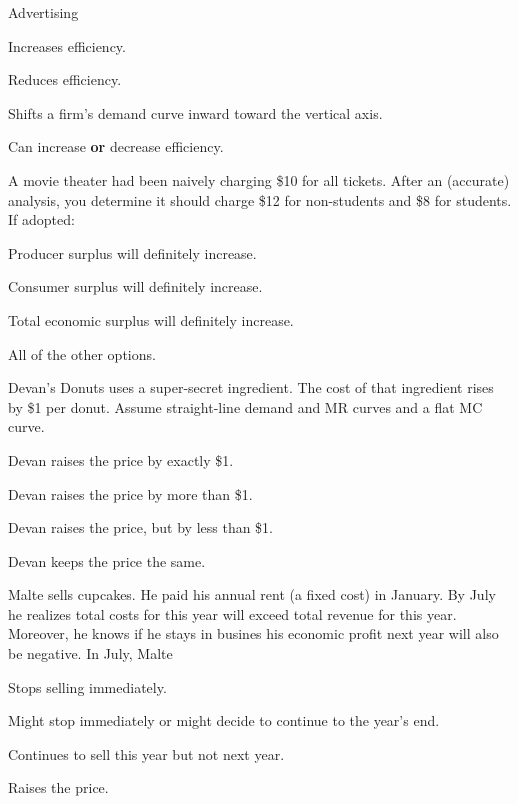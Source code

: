 \documentclass[12pt]{article}
\newcommand{\question}[1]{%
  \Needspace{9\baselineskip}%
  \item #1%
  \vspace{-0.45em}  %
}
\begin{document}
\begin{questions}
  \question{Advertising}
  \begin{choices}
    \item Increases efficiency.
    \item Reduces efficiency.
    \item Shifts a firm’s demand curve inward toward the vertical axis.
    \item Can increase \textbf{or} decrease efficiency.
  \end{choices}


  \question{A movie theater had been naively charging \$10 for all tickets. After an (accurate) analysis, you determine it should charge \$12 for non-students and \$8 for students. If adopted:}
  \begin{choices}
    \item Producer surplus will definitely increase.
    \item Consumer surplus will definitely increase.
    \item Total economic surplus will definitely increase.
    \item All of the other options.
  \end{choices}


  \question{Devan’s Donuts uses a super-secret ingredient. The cost of that ingredient rises by \$1 per donut. Assume straight-line demand and MR curves and a flat MC curve.}
  \begin{choices}
    \item Devan raises the price by exactly \$1.
    \item Devan raises the price by more than \$1.
    \item Devan raises the price, but by less than \$1.
    \item Devan keeps the price the same.
  \end{choices}


  \question{Malte sells cupcakes. He paid his annual rent (a fixed cost) in January. By July he realizes total costs for this year will exceed total revenue for this year. Moreover, he knows if he stays in busines his economic profit next year will also be negative. In July, Malte}
  \begin{choices}
    \item Stops selling immediately.
    \item Might stop immediately or might decide to continue to the year’s end.
    \item Continues to sell this year but not next year.
    \item Raises the price.
  \end{choices}



\end{questions}
\end{document}
